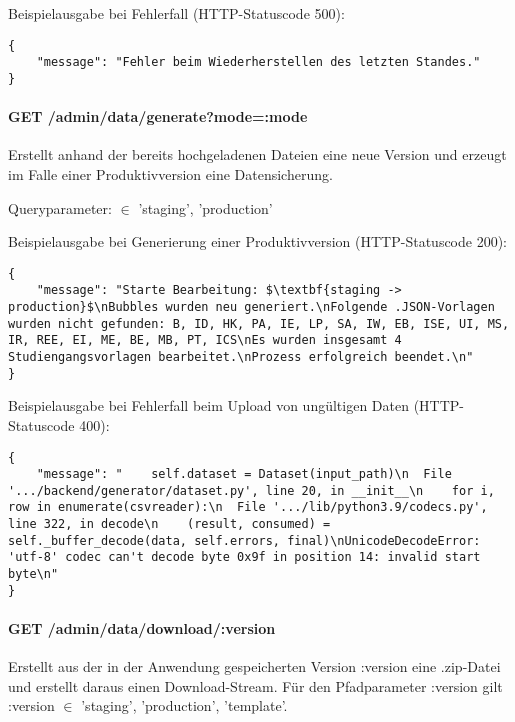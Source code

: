 \noindent
Beispielausgabe bei Fehlerfall (HTTP-Statuscode 500):
\begin{lstlisting}[style=Python]
{
    "message": "Fehler beim Wiederherstellen des letzten Standes."
}
\end{lstlisting}

\paragraph*{GET /admin/data/generate?mode=:mode}
\vspace{-1.0em}
Erstellt anhand der bereits hochgeladenen Dateien eine neue Version und erzeugt im Falle einer Produktivversion eine Datensicherung.

\noindent
Queryparameter:  $\in$ {'staging', 'production'}

\noindent
\begin{minipage}{\linewidth}
Beispielausgabe bei Generierung einer Produktivversion (HTTP-Statuscode 200):
\begin{lstlisting}[style=Python, mathescape=true]
{
    "message": "Starte Bearbeitung: $\textbf{staging -> production}$\nBubbles wurden neu generiert.\nFolgende .JSON-Vorlagen wurden nicht gefunden: B, ID, HK, PA, IE, LP, SA, IW, EB, ISE, UI, MS, IR, REE, EI, ME, BE, MB, PT, ICS\nEs wurden insgesamt 4 Studiengangsvorlagen bearbeitet.\nProzess erfolgreich beendet.\n"
}
\end{lstlisting}
\end{minipage}

\noindent
Beispielausgabe bei Fehlerfall beim Upload von ungültigen Daten (HTTP-Statuscode 400):
\begin{lstlisting}[style=Python]
{
    "message": "    self.dataset = Dataset(input_path)\n  File '.../backend/generator/dataset.py', line 20, in __init__\n    for i, row in enumerate(csvreader):\n  File '.../lib/python3.9/codecs.py', line 322, in decode\n    (result, consumed) = self._buffer_decode(data, self.errors, final)\nUnicodeDecodeError: 'utf-8' codec can't decode byte 0x9f in position 14: invalid start byte\n"
}
\end{lstlisting}

\paragraph*{GET /admin/data/download/:version}
\vspace{-1.0em}
Erstellt aus der in der Anwendung gespeicherten Version :version eine .zip-Datei und erstellt daraus einen Download-Stream. Für den Pfadparameter :version gilt :version $\in$ {'staging', 'production', 'template'}.

